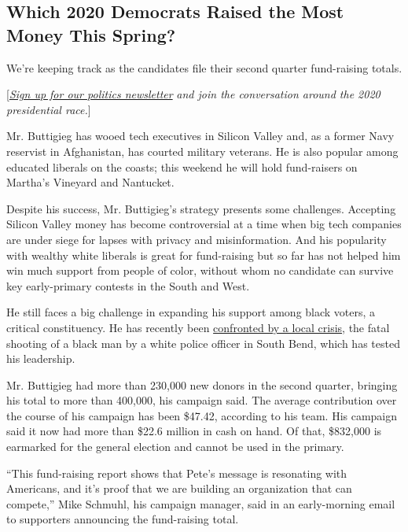 \hypertarget{which-2020-democrats-raised-the-most-money-this-spring}{%
\subsection{Which 2020 Democrats Raised the Most Money This
Spring?}\label{which-2020-democrats-raised-the-most-money-this-spring}}

We're keeping track as the candidates file their second quarter
fund-raising totals.

{[}\href{https://www.nytimes3xbfgragh.onion/newsletters/politics?smid=rd?action=click\&module=Intentional\&pgtype=Article}{\emph{Sign
up for our politics newsletter}} \emph{and join the conversation around
the 2020 presidential race.}{]}

Mr. Buttigieg has wooed tech executives in Silicon Valley and, as a
former Navy reservist in Afghanistan, has courted military veterans. He
is also popular among educated liberals on the coasts; this weekend he
will hold fund-raisers on Martha's Vineyard and Nantucket.

Despite his success, Mr. Buttigieg's strategy presents some challenges.
Accepting Silicon Valley money has become controversial at a time when
big tech companies are under siege for lapses with privacy and
misinformation. And his popularity with wealthy white liberals is great
for fund-raising but so far has not helped him win much support from
people of color, without whom no candidate can survive key early-primary
contests in the South and West.

He still faces a big challenge in expanding his support among black
voters, a critical constituency. He has recently been
\href{https://www.nytimes3xbfgragh.onion/2019/06/28/us/politics/pete-buttigieg-debate-south-bend.html}{confronted
by a local crisis}, the fatal shooting of a black man by a white police
officer in South Bend, which has tested his leadership.

Mr. Buttigieg had more than 230,000 new donors in the second quarter,
bringing his total to more than 400,000, his campaign said. The average
contribution over the course of his campaign has been \$47.42, according
to his team. His campaign said it now had more than \$22.6 million in
cash on hand. Of that, \$832,000 is earmarked for the general election
and cannot be used in the primary.

``This fund-raising report shows that Pete's message is resonating with
Americans, and it's proof that we are building an organization that can
compete,'' Mike Schmuhl, his campaign manager, said in an early-morning
email to supporters announcing the fund-raising total.


